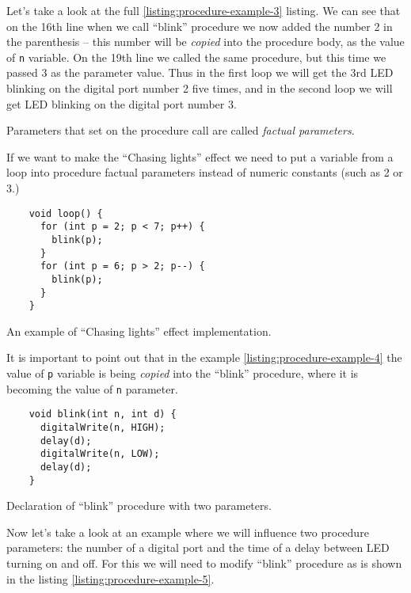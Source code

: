 \documentclass[../sparc.tex]{subfiles}
\begin{document}
Let's take a look at the full \ref{listing:procedure-example-3} listing.  We can
see that on the 16th line when we call ``blink'' procedure we now added the
number 2 in the parenthesis -- this number will be \emph{copied} into the
procedure body, as the value of \texttt{n} variable.  On the 19th line
we called the same procedure, but this time we passed 3 as the parameter value.
Thus in the first loop we will get the 3rd LED blinking on the digital port
number 2 five times, and in the second loop we will get LED blinking on the
digital port number 3.

Parameters that set on the procedure call are called \emph{factual parameters}.

If we want to make the ``Chasing lights'' effect we need to put a variable from
a loop into procedure factual parameters instead of numeric constants (such as 2
or 3.)

\begin{listing}[H]
  \begin{verbatim}
    void loop() {
      for (int p = 2; p < 7; p++) {
        blink(p);
      }
      for (int p = 6; p > 2; p--) {
        blink(p);
      }
    }
  \end{verbatim}
  \label{listing:procedure-example-4}
  \caption{An example of ``Chasing lights'' effect implementation.}
\end{listing}

It is important to point out that in the example
\ref{listing:procedure-example-4} the value of \texttt{p} variable is
being \emph{copied} into the ``blink'' procedure, where it is becoming the value
of \texttt{n} parameter.

\begin{listing}[H]
  \begin{verbatim}
    void blink(int n, int d) {
      digitalWrite(n, HIGH);
      delay(d);
      digitalWrite(n, LOW);
      delay(d);
    }
  \end{verbatim}
  \label{listing:procedure-example-5}
  \caption{Declaration of ``blink'' procedure with two parameters.}
\end{listing}

Now let's take a look at an example where we will influence two procedure
parameters: the number of a digital port and the time of a delay between LED
turning on and off.  For this we will need to modify ``blink'' procedure as is
shown in the listing \ref{listing:procedure-example-5}.
\end{document}
